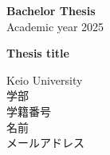 
\setmainfont{Times New Roman}


\vspace*{2cm}
\begin{center}
    {\LARGE \textbf{Bachelor Thesis}}\\[1em]
    Academic year 2025
\end{center}

\vspace*{4cm}

\begin{center}
    \LARGE \textbf{Thesis title}\\[0.5em]
\end{center}

\vfill

\begin{center}
    Keio University\\
    学部\\[1em]
    学籍番号\\
    名前\\[1em]
    メールアドレス
\end{center}

